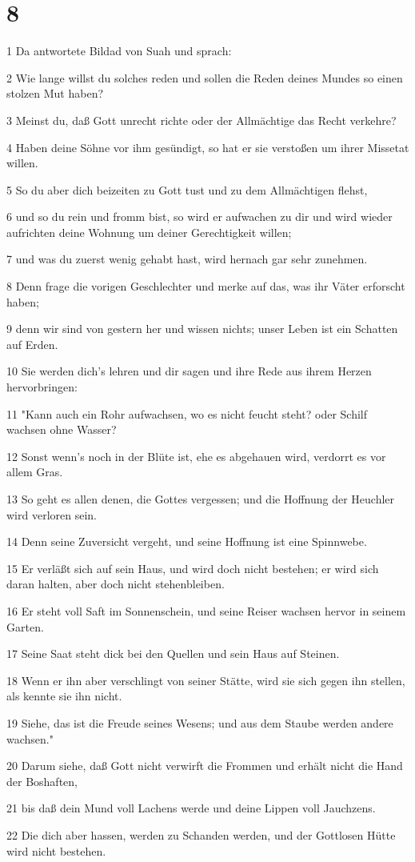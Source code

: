 \chapter{8}

\par 1 Da antwortete Bildad von Suah und sprach:
\par 2 Wie lange willst du solches reden und sollen die Reden deines Mundes so einen stolzen Mut haben?
\par 3 Meinst du, daß Gott unrecht richte oder der Allmächtige das Recht verkehre?
\par 4 Haben deine Söhne vor ihm gesündigt, so hat er sie verstoßen um ihrer Missetat willen.
\par 5 So du aber dich beizeiten zu Gott tust und zu dem Allmächtigen flehst,
\par 6 und so du rein und fromm bist, so wird er aufwachen zu dir und wird wieder aufrichten deine Wohnung um deiner Gerechtigkeit willen;
\par 7 und was du zuerst wenig gehabt hast, wird hernach gar sehr zunehmen.
\par 8 Denn frage die vorigen Geschlechter und merke auf das, was ihr Väter erforscht haben;
\par 9 denn wir sind von gestern her und wissen nichts; unser Leben ist ein Schatten auf Erden.
\par 10 Sie werden dich's lehren und dir sagen und ihre Rede aus ihrem Herzen hervorbringen:
\par 11 "Kann auch ein Rohr aufwachsen, wo es nicht feucht steht? oder Schilf wachsen ohne Wasser?
\par 12 Sonst wenn's noch in der Blüte ist, ehe es abgehauen wird, verdorrt es vor allem Gras.
\par 13 So geht es allen denen, die Gottes vergessen; und die Hoffnung der Heuchler wird verloren sein.
\par 14 Denn seine Zuversicht vergeht, und seine Hoffnung ist eine Spinnwebe.
\par 15 Er verläßt sich auf sein Haus, und wird doch nicht bestehen; er wird sich daran halten, aber doch nicht stehenbleiben.
\par 16 Er steht voll Saft im Sonnenschein, und seine Reiser wachsen hervor in seinem Garten.
\par 17 Seine Saat steht dick bei den Quellen und sein Haus auf Steinen.
\par 18 Wenn er ihn aber verschlingt von seiner Stätte, wird sie sich gegen ihn stellen, als kennte sie ihn nicht.
\par 19 Siehe, das ist die Freude seines Wesens; und aus dem Staube werden andere wachsen."
\par 20 Darum siehe, daß Gott nicht verwirft die Frommen und erhält nicht die Hand der Boshaften,
\par 21 bis daß dein Mund voll Lachens werde und deine Lippen voll Jauchzens.
\par 22 Die dich aber hassen, werden zu Schanden werden, und der Gottlosen Hütte wird nicht bestehen.

